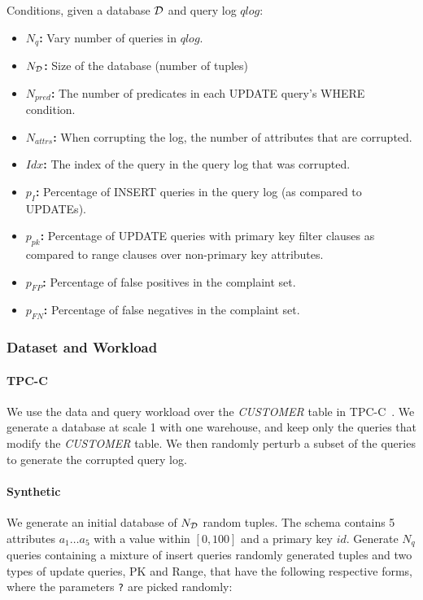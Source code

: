 Conditions, given a database ${\cal D}$ and query log $qlog$:

\begin{itemize}
\item {\bf $N_q$:} Vary number of queries in $qlog$.
\item {\bf $N_{\cal D}$: } Size of the database (number of tuples)
\item {\bf $N_{pred}$:} The number of predicates in each UPDATE query's WHERE condition.
\item {\bf $N_{attrs}$: } When corrupting the log, the number of attributes that are corrupted.
\item {\bf $Idx$: } The index of the query in the query log that was corrupted.
\item {\bf $p_{I}$: } Percentage of INSERT queries in the query log (as compared to UPDATEs).
\item {\bf $p_{pk}$: } Percentage of UPDATE queries with primary key filter clauses as compared to range clauses over non-primary key attributes.
\item {\bf $p_{FP}$: } Percentage of false positives in the complaint set.
\item {\bf $p_{FN}$: } Percentage of false negatives in the complaint set.
\end{itemize}

\subsubsection{Dataset and Workload}


\paragraph{TPC-C} We use the data and query workload over the {\it
CUSTOMER} table in TPC-C~\cite{}.  We generate a database at scale
1 with one warehouse, and keep only the queries that modify the
{\it CUSTOMER} table.  We then randomly perturb a subset of the
queries to generate the corrupted query log.

\paragraph{Synthetic} 
We generate an initial database of $N_{\cal D}$ random tuples.  
The schema contains 5 attributes $a_1\ldots a_5$ with a value
within $[0, 100]$ and a primary key $id$. 
Generate $N_q$ queries containing a mixture of insert queries  randomly generated tuples and two types of update
queries, PK and Range, that have the following respective forms, 
where the parameters \verb|?| are picked randomly:


